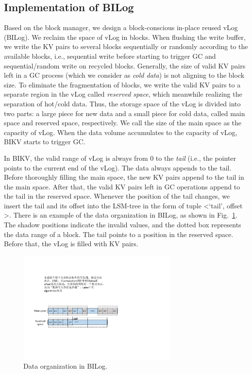 \documentclass[sigconf]{acmart}
\begin{document}
\subsection{Implementation of BILog} \label{ss2}
Based on the block manager, we design a block-conscious in-place reused vLog (BILog). We reclaim the space of vLog in blocks. When flushing the write buffer, we write the KV pairs to several blocks sequentially or randomly according to the available blocks, i.e., sequential write before starting to trigger GC and sequential/random write on recycled blocks. Generally, the size of valid KV pairs left in a GC process (which we consider as \textit{cold data}) is not aligning to the block size. To eliminate the fragmentation of blocks, we write the valid KV pairs to a separate region in the vLog called \textit{reserved space}, which meanwhile realizing the separation of hot/cold data. Thus, the storage space of the vLog is divided into two parts: a large piece for new data and a small piece for cold data, called main space and reserved space, respectively. We call the size of the main space as the capacity of vLog. When the data volume accumulates to the capacity of vLog, BIKV starts to trigger GC.

In BIKV, the valid range of vLog is always from 0 to the \textit{tail} (i.e., the pointer points to the current end of the vLog). The data always appends to the tail. Before thoroughly filling the main space, the new KV pairs append to the tail in the main space. After that, the valid KV pairs left in GC operations append to the tail in the reserved space. Whenever the position of the tail changes, we insert the tail and its offset into the LSM-tree in the form of tuple \textless `tail', offset \textgreater. There is an example of the data organization in BILog, as shown in Fig.~\ref{fig:ipbrLog}. The shadow positions indicate the invalid values, and the dotted box represents the data range of a block. The tail points to a position in the reserved space. Before that, the vLog is filled with KV pairs.  

\begin{figure}[!t]
	\setlength{\abovecaptionskip}{0.cm}	
	\setlength{\belowcaptionskip}{-0.cm}
	\centerline{\includegraphics[width=80mm]{vLog.pdf}}
	\caption{Data organization in BILog.}
	\label{fig:ipbrLog}
\end{figure}
\end{document}
